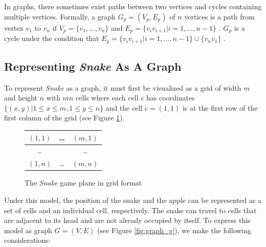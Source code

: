 \documentclass[12pt]{article}
\begin{document}
In graphs, there sometimes exist paths between two vertices and cycles containing multiple vertices. Formally, a graph $G_{p}=(V_{p}, E_{p})$ of $n$ vertices is a path from vertex $v_{1}$ to $v_{n}$ if $V_{p} = \{v_{1}, \ldots , v_{n} \}$ and $E_{p} = \{v_{i}v_{i+1} | i = 1, \ldots, n - 1\}$ \cite{galvin2009}. $G_{p}$ is a cycle under the condition that $E_{p} = \{v_{i}v_{i+1} | i = 1, \ldots, n - 1\} \cup \{ v_{n}v_{1} \}$ \cite{galvin2009}.

\subsection{Representing \textit{Snake} As A Graph}

To represent \textit{Snake} as a graph, it must first be visualized as a grid of width $m$ and height $n$ with $mn$ cells where each cell $c$ has coordinates $\{ (x, y) | 1 \leq x \leq m, 1 \leq y \leq n \}$ and the cell $c=(1,1)$ is at the first row of the first column of the grid (see Figure \ref{fig:snake_grid}).

\begin{figure}[!h]
\centering
	\begin{tabular}{ | c | c | c | }
	\hline
	$(1, 1)$ & \ldots & $(m, 1)$ \\
	\hline
	\ldots &  & \ldots \\
	\hline
	$(1, n)$ & \ldots & $(m, n)$ \\
	\hline		
	\end{tabular}
	\caption{The \textit{Snake} game plane in grid format}
	\label{fig:snake_grid}
\end{figure}

Under this model, the position of the snake and the apple can be represented as a set of cells and an individual cell, respectively. The snake can travel to cells that are adjacent to its head and are not already occupied by itself. To express this model as graph $G=(V,E)$ (see Figure \ref{fig:graph_g}), we make the following considerations:
\end{document}
